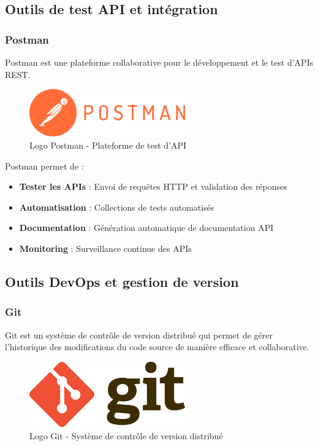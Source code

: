\documentclass[12pt,a4paper]{report}
\begin{document}
\subsection{Outils de test API et intégration}

\subsubsection{Postman}

Postman est une plateforme collaborative pour le développement et le test d'APIs REST.

\begin{figure}[htbp]
    \centering
    \includegraphics[width=0.6\textwidth]{latex_media/media/postman.png}
    \caption{Logo Postman - Plateforme de test d'API}
    \label{fig:postman-logo}
\end{figure}

Postman permet de :
\begin{itemize}
    \item \textbf{Tester les APIs} : Envoi de requêtes HTTP et validation des réponses
    \item \textbf{Automatisation} : Collections de tests automatisés
    \item \textbf{Documentation} : Génération automatique de documentation API
    \item \textbf{Monitoring} : Surveillance continue des APIs
\end{itemize}

\subsection{Outils DevOps et gestion de version}

\subsubsection{Git}

Git est un système de contrôle de version distribué qui permet de gérer l'historique des modifications du code source de manière efficace et collaborative.

\begin{figure}[htbp]
    \centering
    \includegraphics[width=0.6\textwidth]{latex_media/media/git.png}
    \caption{Logo Git - Système de contrôle de version distribué}
    \label{fig:git-logo}
\end{figure}
\end{document}

